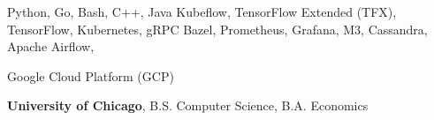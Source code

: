 \documentclass[alternative,10pt,compact]{yaac-another-awesome-cv}
\begin{document}

\begin{keywords}
  {
    Python,
    Go,
    Bash,
    C++,
    Java
  }
  {
    Kubeflow,
    TensorFlow Extended (TFX),
    TensorFlow,
  }
  {
    Kubernetes,
    gRPC
  }
  {
    Bazel,
    Prometheus,
    Grafana,
    M3,
    Cassandra,
    Apache Airflow,
  }

  {
    Google Cloud Platform (GCP)
  }
\end{keywords}


\begin{scholarship}
  {\textbf{University of Chicago}, B.S. Computer Science, B.A. Economics}
\end{scholarship}
\end{document}
